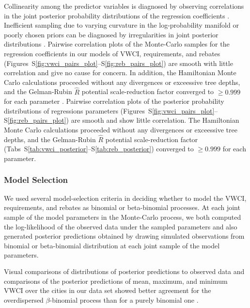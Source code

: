 \documentclass[draft]{agujournal}
\begin{document}
Collinearity among the predictor variables is diagnosed by observing correlations
in the joint posterior probability distributions of the regression coefficients
\citep[pp.~288--293]{stan:manual:2015}.
Inefficient sampling due to varying curvature in the log-probability manifold or
poorly chosen priors can be diagnosed by irregularities in joint posterior
distributions \citep[pp.~316--321]{stan:manual:2015}. Pairwise correlation
plots of the Monte-Carlo samples for the regression coefficients in our models
of VWCI, requirements, and rebates
(Figures~S\ref{fig:vwci_pairs_plot}--S\ref{fig:reb_pairs_plot}) are smooth with
little correlation and give no cause for concern.
In addition, the Hamiltonian Monte Carlo calculations proceeded without any
divergences or exceessive tree depths, and the Gelman-Rubin $\hat R$ potential
scale-reduction factor converged to $\ge 0.999$ for each parameter
\citep{stan:manual:2015}.
\else
Pairwise correlation plots of the posterior probability distributions of
regressions parameters (Figures~S\ref{fig:vwci_pairs_plot}--S\ref{fig:reb_pairs_plot})
are smooth and show little correlation. The Hamiltonian Monte Carlo calculations
proceeded without any divergences or exceessive tree depths, and the Gelman-Rubin
$\hat R$ potential scale-reduction factor
(Tabs~S\ref{tab:vwci_posterior}--S\ref{tab:reb_posterior}) converged to
$\ge 0.999$ for each parameter.
\fi

\subsubsection*{Model Selection}

\iftrue
We used several model-selection criteria in deciding whether to model the VWCI,
requirements, and rebates as binomial or beta-binomial processes. At each joint
sample of the model parameters in the Monte-Carlo process, we both computed the
log-likelihood of the observed data under the sampled parameters and also
generated posterior predictions obtained by drawing simulated observations from
binomial or beta-binomial distribution at each joint sample of the model parameters.

Visual comparisons of distributions of posterior predictions to observed data and
comparisons of the posterior predictions of mean, maximum, and minimum VWCI over
the cities in our data set showed better agreement for the overdispersed
$\beta$-binomial process than for a purely binomial one \citep{gelman:bda:2014}.
\end{document}
